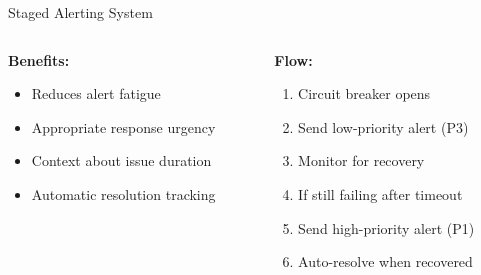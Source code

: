 \documentclass[aspectratio=169]{beamer}
\begin{document}
\begin{frame}{Staged Alerting System}
    \begin{columns}
        \begin{column}{0.5\textwidth}
            \textbf{Benefits:}
            \begin{itemize}
                \item Reduces alert fatigue
                \item Appropriate response urgency
                \item Context about issue duration
                \item Automatic resolution tracking
            \end{itemize}
        \end{column}
        \begin{column}{0.5\textwidth}
            \textbf{Flow:}
            \begin{enumerate}
                \item Circuit breaker opens
                \item Send low-priority alert (P3)
                \item Monitor for recovery
                \item If still failing after timeout
                \item Send high-priority alert (P1)
                \item Auto-resolve when recovered
            \end{enumerate}
        \end{column}
    \end{columns}
\end{frame}
\end{document}
